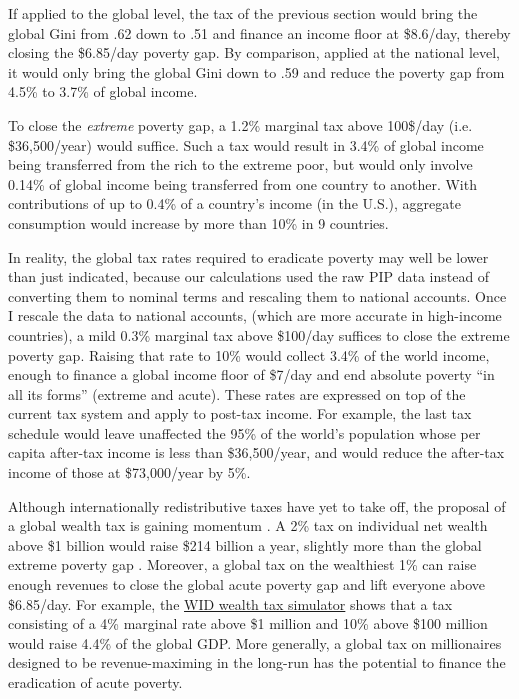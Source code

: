 \documentclass[12pt,english]{article}
\begin{document}
If applied to the global level, the tax of the previous section would bring the global Gini from .62 down to .51 and finance an income floor at \$8.6/day, thereby closing the \$6.85/day poverty gap. By comparison, applied at the national level, it would only bring the global Gini down to .59 and reduce the poverty gap from 4.5\% to 3.7\% of global income. 

To close the \textit{extreme} poverty gap, a 1.2\% marginal tax %
above 100\$/day (i.e. \$36,500/year) would suffice. %
Such a tax would result in 3.4\% of global income being transferred from the rich to the extreme poor, but would only involve 0.14\% of global income being transferred from one country to another. 
With contributions of up to 0.4\% of a country's income (in the U.S.), aggregate consumption would increase by more than 10\% in 9 countries. 

In reality, the global tax rates required to eradicate poverty may well be lower than just indicated, because our calculations used the raw PIP data instead of converting them to nominal terms and rescaling them to national accounts. Once I rescale the data to national accounts, (which are more accurate in high-income countries), 
a mild 0.3\% marginal tax above \$100/day suffices to close the extreme poverty gap. Raising that rate to 10\% would collect 3.4\% of the world income, enough to finance a global income floor of \$7/day and end absolute poverty ``in all its forms'' (extreme and acute). 
These rates are expressed on top of the current tax system and apply to post-tax income. For example, the last tax schedule would leave unaffected the 95\% of the world's population whose per capita after-tax income is less than \$36,500/year, and would reduce the after-tax income of those at \$73,000/year by 5\%. 


Although internationally redistributive taxes have yet to take off, the proposal of a global wealth tax is gaining momentum \citep{piketty_brief_2022}. A 2\% tax on individual net wealth above \$1 billion would raise \$214 billion a year, slightly more than the global extreme poverty gap \citep{alstadsaeter_global_2024}. Moreover, a global tax on the wealthiest 1\% can raise enough revenues to close the global acute poverty gap and lift everyone above \$6.85/day. For example, the \href{https://wid.world/world-wealth-tax-simulator}{WID wealth tax simulator} shows that a tax consisting of a 4\% marginal rate above \$1 million and 10\% above \$100 million would raise 4.4\% of the global GDP. More generally, a global tax on millionaires designed to be revenue-maximing in the long-run has the potential to finance the eradication of acute poverty. 
\end{document}

